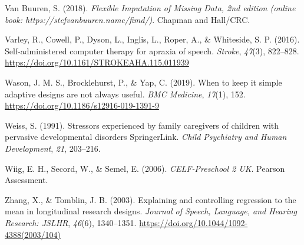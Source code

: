 \documentclass{krantz}
\newlength{\cslhangindent}
\newlength{\cslentryspacingunit} %
\newenvironment{CSLReferences}[2] %
{%
\setlength{\parindent}{0pt}
\ifodd #1
\let\oldpar\par
\def\par{\hangindent=\cslhangindent\oldpar}
\fi
\setlength{\parskip}{#2\cslentryspacingunit}
}%
{}
\begin{document}
\begin{CSLReferences}{1}{0}
\leavevmode{}%
Van Buuren, S. (2018). \emph{Flexible {Imputation} of {Missing Data}, 2nd edition (online book: {https://stefvanbuuren.name/fimd/)}}. {Chapman and Hall/CRC}.

\leavevmode{}%
Varley, R., Cowell, P., Dyson, L., Inglis, L., Roper, A., \& Whiteside, S. P. (2016). Self-administered computer therapy for apraxia of speech. \emph{Stroke}, \emph{47}(3), 822--828. \url{https://doi.org/10.1161/STROKEAHA.115.011939}

\leavevmode{}%
Wason, J. M. S., Brocklehurst, P., \& Yap, C. (2019). When to keep it simple \textendash{} adaptive designs are not always useful. \emph{BMC Medicine}, \emph{17}(1), 152. \url{https://doi.org/10.1186/s12916-019-1391-9}

\leavevmode{}%
Weiss, S. (1991). Stressors experienced by family caregivers of children with pervasive developmental disorders \textbar{} {SpringerLink}. \emph{Child Psychiatry and Human Development}, \emph{21}, 203--216.

\leavevmode{}%
Wiig, E. H., Secord, W., \& Semel, E. (2006). \emph{{CELF-Preschool} 2 {UK}}. {Pearson Assessment}.

\leavevmode{}%
Zhang, X., \& Tomblin, J. B. (2003). Explaining and controlling regression to the mean in longitudinal research designs. \emph{Journal of Speech, Language, and Hearing Research: JSLHR}, \emph{46}(6), 1340--1351. \url{https://doi.org/10.1044/1092-4388(2003/104)}

\end{CSLReferences}

\printindex
\end{document}
